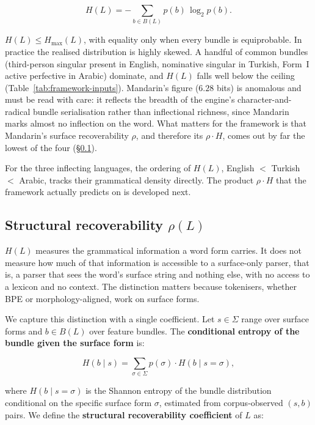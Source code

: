 \begin{equation}
H(L) = -\sum_{b \in B(L)} p(b) \, \log_2 p(b).
\label{eq:H}
\end{equation}

$H(L) \le H_{\max}(L)$, with equality only when every bundle is equiprobable. In practice the realised distribution is highly skewed. A handful of common bundles (third-person singular present in English, nominative singular in Turkish, Form~I active perfective in Arabic) dominate, and $H(L)$ falls well below the ceiling (Table~\ref{tab:framework-inputs}). Mandarin's figure ($6.28$ bits) is anomalous and must be read with care: it reflects the breadth of the engine's character-and-radical bundle serialisation rather than inflectional richness, since Mandarin marks almost no inflection on the word. What matters for the framework is that Mandarin's surface recoverability $\rho$, and therefore its $\rho \cdot H$, comes out by far the lowest of the four (\S\ref{sec:framework-rho}).

For the three inflecting languages, the ordering of $H(L)$, English $<$ Turkish $<$ Arabic, tracks their grammatical density directly. The product $\rho \cdot H$ that the framework actually predicts on is developed next.

\subsection{Structural recoverability $\rho(L)$}
\label{sec:framework-rho}

$H(L)$ measures the grammatical information a word form carries. It does not measure how much of that information is accessible to a surface-only parser, that is, a parser that sees the word's surface string and nothing else, with no access to a lexicon and no context. The distinction matters because tokenisers, whether BPE or morphology-aligned, work on surface forms.

We capture this distinction with a single coefficient. Let $s \in \Sigma$ range over surface forms and $b \in B(L)$ over feature bundles. The \textbf{conditional entropy of the bundle given the surface form} is:

\begin{equation}
H(b \mid s) = \sum_{\sigma \in \Sigma} p(\sigma) \cdot H(b \mid s = \sigma),
\label{eq:Hcond}
\end{equation}

where $H(b \mid s = \sigma)$ is the Shannon entropy of the bundle distribution conditional on the specific surface form $\sigma$, estimated from corpus-observed $(s, b)$ pairs. We define the \textbf{structural recoverability coefficient} of $L$ as:

